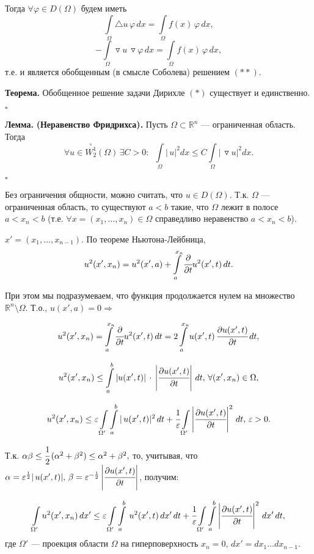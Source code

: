 \documentclass[12pt,a4paper,draft]{article}
\DeclareRobustCommand*{\т}{~--- }
\DeclareRobustCommand*{\ч}{~-- }
\begin{document}
Тогда $\forall \varphi \in D(\Omega)$ будем иметь
$$\int\limits_{\Omega}\triangle u\,\varphi\,dx=
\int\limits_{\Omega}f(x)\,\varphi\,dx,$$
$$-\int\limits_{\Omega}\triangledown
u\,\triangledown\varphi\,dx=
\int\limits_{\Omega}f(x)\,\varphi\,dx,$$ т.е. и является
обобщенным (в смысле Соболева) решением $(**)$.

\textbf{Теорема.} Обобщенное решение задачи Дирихле $(*)$
существует и единственно.

$\square$

\textbf{Лемма.} \textbf{(Неравенство Фридрихса).} Пусть
$\Omega\subset \mathbb R^n$ --- ограниченная область. Тогда
$$\forall u\in \overset{\circ}{W_2^1}(\Omega)\,\exists
C>0\colon\,\,\,\int\limits_{\Omega}|\,u|^2dx\le C
\int\limits_{\Omega}|\,\triangledown u|^2 dx.$$

$\square$

Без ограничения общности, можно считать, что $u\in D(\Omega)$.
Т.к. $\Omega$ --- ограниченная область, то существуют $a<b$
 такие, что $\Omega$ лежит в полосе $a<x_n<b$ (т.е. $\forall
 x=(x_1,\ldots,x_n)\in\Omega$ справедливо неравенство $a<x_n<b$).

$x'=(x_1,\ldots,x_{n-1}).$ По теореме Ньютона-Лейбница,
$$u^2(x',x_n)=u^2(x',a)+\int\limits_a^{x_n}\cfrac{\partial}{\partial t}u^2(x',t)\,dt.$$

При этом мы подразумеваем, что функция продолжается нулем на
множество $\mathbb R^n\setminus\Omega.$ Т.о.,
$u(x',a)=0\Rightarrow$

$$u^2(x',x_n)=\int\limits_a^{x_n}\cfrac{\partial}{\partial t}u^2(x',t)\,dt=
2\int\limits_a^{x_n}u(x',t)\,\cfrac{\partial u(x',t)}{\partial
t}\,dt,$$

$$u^2(x',x_n)\le \int\limits_a^{b}|u(x',t)|\,\cdot\,\left|\cfrac{\partial u(x',t)}{\partial
t}\right|\,dt,\,\forall (x',x_n)\in\Omega,$$

$$u^2(x',x_n)\le
\varepsilon
\int\limits_{\Omega'}\int\limits_a^{b}|\,u(x',t)|^2\,dt+
\cfrac1{\varepsilon} \int\limits_{\Omega'}\left|\cfrac{\partial
u(x',t)}{\partial t}\right|^2\,dt,\,\varepsilon>0.$$

Т.к. $\alpha\beta\le \cfrac12\,(\alpha^2+\beta^2)\le
\alpha^2+\beta^2,$ то, учитывая, что
$\alpha=\varepsilon^{\frac12}|\,u(x',t)|,\,
\beta=\varepsilon^{-\frac12}\left|\cfrac{\partial
u(x',t)}{\partial t}\right|$, получим:

$$\int\limits_{\Omega'}u^2(x',x_n)\,dx'\le
\varepsilon
\int\limits_{\Omega'}\int\limits_a^{b}\,u^2(x',t)\,dx'\,dt+
\cfrac1{\varepsilon}
\int\limits_{\Omega'}\int\limits_a^{b}\left|\cfrac{\partial
u(x',t)}{\partial t}\right|^2\,dx'\,dt,$$ где $\Omega'$ ---
проекция области $\Omega$ на гиперповерхность
$x_n=0,\,dx'=dx_1\ldots dx_{n-1}.$
\end{document}
